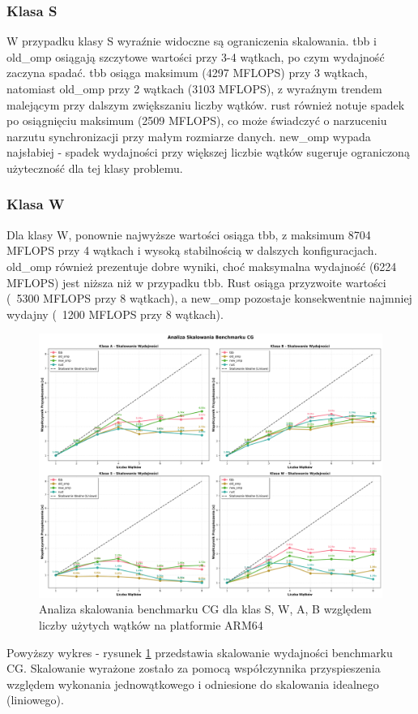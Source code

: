 \subsubsection{Klasa S}
W przypadku klasy S wyraźnie widoczne są ograniczenia skalowania. tbb i old\_omp osiągają szczytowe wartości przy 3-4 wątkach, po czym wydajność zaczyna spadać. tbb osiąga maksimum (4297 MFLOPS) przy 3 wątkach, natomiast old\_omp przy 2 wątkach (3103 MFLOPS), z wyraźnym trendem malejącym przy dalszym zwiększaniu liczby wątków. rust również notuje spadek po osiągnięciu maksimum (2509 MFLOPS), co może świadczyć o narzuceniu narzutu synchronizacji przy małym rozmiarze danych. new\_omp wypada najsłabiej - spadek wydajności przy większej liczbie wątków sugeruje ograniczoną użyteczność dla tej klasy problemu.

\subsubsection{Klasa W}
Dla klasy W, ponownie najwyższe wartości osiąga tbb, z maksimum 8704 MFLOPS przy 4 wątkach i wysoką stabilnością w dalszych konfiguracjach. old\_omp również prezentuje dobre wyniki, choć maksymalna wydajność (6224 MFLOPS) jest niższa niż w przypadku tbb. Rust osiąga przyzwoite wartości (~5300 MFLOPS przy 8 wątkach), a new\_omp pozostaje konsekwentnie najmniej wydajny (~1200 MFLOPS przy 8 wątkach).


\begin{figure}[H]
    \centering
    \includegraphics[width=\textwidth]{analiza/images/parallel/cg/arm/cg_analiza_skalowania.png}
    \caption{Analiza skalowania benchmarku CG dla klas S, W, A, B względem liczby użytych wątków na platformie ARM64}
    \label{cg_analiza_skalowania}
\end{figure}
Powyższy wykres - rysunek \ref{cg_analiza_skalowania} przedstawia skalowanie wydajności benchmarku CG. Skalowanie wyrażone zostało za pomocą współczynnika przyspieszenia względem wykonania jednowątkowego i odniesione do skalowania idealnego (liniowego).

